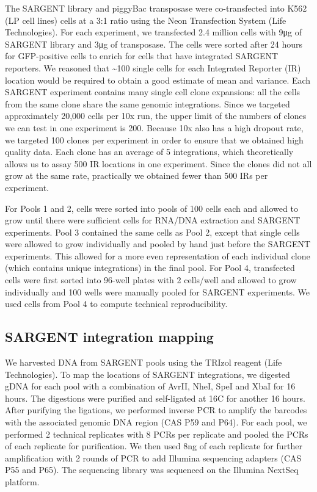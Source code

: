The SARGENT library and piggyBac transposase were co-transfected into K562 (LP cell lines) cells at a 3:1 ratio using the Neon Transfection System (Life Technologies). For each experiment, we transfected 2.4 million cells with 9μg of SARGENT library and 3μg of transposase. The cells were sorted after 24 hours for GFP-positive cells to enrich for cells that have integrated SARGENT reporters. We reasoned that \textasciitilde100 single cells for each Integrated Reporter (IR) location would be required to obtain a good estimate of mean and variance. Each SARGENT experiment contains many single cell clone expansions: all the cells from the same clone share the same genomic integrations. Since we targeted approximately 20,000 cells per 10x run, the upper limit of the numbers of clones we can test in one experiment is 200. Because 10x also has a high dropout rate, we targeted 100 clones per experiment in order to ensure that we obtained high quality data. Each clone has an average of 5 integrations, which theoretically allows us to assay 500 IR locations in one experiment. Since the clones did not all grow at the same rate, practically we obtained fewer than 500 IRs per experiment.

For Pools 1 and 2, cells were sorted into pools of 100 cells each and allowed to grow until there were sufficient cells for RNA/DNA extraction and SARGENT experiments. Pool 3 contained the same cells as Pool 2, except that single cells were allowed to grow individually and pooled by hand just before the SARGENT experiments. This allowed for a more even representation of each individual clone (which contains unique integrations) in the final pool. For Pool 4, transfected cells were first sorted into 96-well plates with 2 cells/well and allowed to grow individually and 100 wells were manually pooled for SARGENT experiments. We used cells from Pool 4 to compute technical reproducibility.

\subsection*{SARGENT integration mapping}

We harvested DNA from SARGENT pools using the TRIzol reagent (Life Technologies). To map the locations of SARGENT integrations, we digested gDNA for each pool with a combination of AvrII, NheI, SpeI and XbaI for 16 hours. The digestions were purified and self-ligated at 16\dg C for another 16 hours. After purifying the ligations, we performed inverse PCR to amplify the barcodes with the associated genomic DNA region (CAS P59 and P64). For each pool, we performed 2 technical replicates with 8 PCRs per replicate and pooled the PCRs of each replicate for purification. We then used 8ng of each replicate for further amplification with 2 rounds of PCR to add Illumina sequencing adapters (CAS P55 and P65). The sequencing library was sequenced on the Illumina NextSeq platform. 

